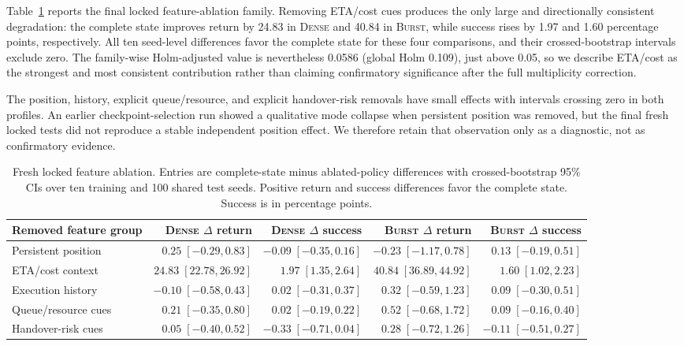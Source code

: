 \documentclass[journal]{IEEEtran}
\begin{document}
Table~\ref{tab:feature_ablation} reports the final locked feature-ablation family. Removing ETA/cost cues produces the only large and directionally consistent degradation: the complete state improves return by 24.83 in \textsc{Dense} and 40.84 in \textsc{Burst}, while success rises by 1.97 and 1.60 percentage points, respectively. All ten seed-level differences favor the complete state for these four comparisons, and their crossed-bootstrap intervals exclude zero. The family-wise Holm-adjusted value is nevertheless 0.0586 (global Holm 0.109), just above 0.05, so we describe ETA/cost as the strongest and most consistent contribution rather than claiming confirmatory significance after the full multiplicity correction.

The position, history, explicit queue/resource, and explicit handover-risk removals have small effects with intervals crossing zero in both profiles. An earlier checkpoint-selection run showed a qualitative mode collapse when persistent position was removed, but the final fresh locked tests did not reproduce a stable independent position effect. We therefore retain that observation only as a diagnostic, not as confirmatory evidence.

\begin{table}[!t]
\centering
\caption{Fresh locked feature ablation. Entries are complete-state minus ablated-policy differences with crossed-bootstrap 95\% CIs over ten training and 100 shared test seeds. Positive return and success differences favor the complete state. Success is in percentage points.}
\label{tab:feature_ablation}
\scriptsize
\setlength{\tabcolsep}{3.1pt}
\begin{tabular}{lrrrr}
\toprule
Removed feature group & \textsc{Dense} $\Delta$ return & \textsc{Dense} $\Delta$ success & \textsc{Burst} $\Delta$ return & \textsc{Burst} $\Delta$ success \\
\midrule
Persistent position & $0.25\;[-0.29,0.83]$ & $-0.09\;[-0.35,0.16]$ & $-0.23\;[-1.17,0.78]$ & $0.13\;[-0.19,0.51]$ \\
ETA/cost context & $\mathbf{24.83\;[22.78,26.92]}$ & $\mathbf{1.97\;[1.35,2.64]}$ & $\mathbf{40.84\;[36.89,44.92]}$ & $\mathbf{1.60\;[1.02,2.23]}$ \\
Execution history & $-0.10\;[-0.58,0.43]$ & $0.02\;[-0.31,0.37]$ & $0.32\;[-0.59,1.23]$ & $0.09\;[-0.30,0.51]$ \\
Queue/resource cues & $0.21\;[-0.35,0.80]$ & $0.02\;[-0.19,0.22]$ & $0.52\;[-0.68,1.72]$ & $0.09\;[-0.16,0.40]$ \\
Handover-risk cues & $0.05\;[-0.40,0.52]$ & $-0.33\;[-0.71,0.04]$ & $0.28\;[-0.72,1.26]$ & $-0.11\;[-0.51,0.27]$ \\
\bottomrule
\end{tabular}
\end{table}
\end{document}
